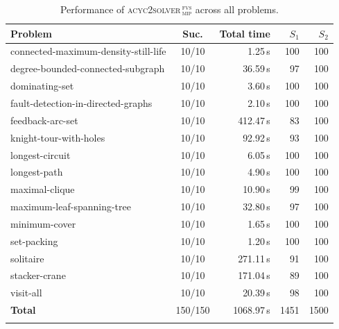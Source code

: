 \begin{table}[htbp]
\centering
\caption{Performance of \textsc{acyc2solver\,$_{\text{mip}}^{\text{fvs}}$} across all problems.}
\label{tab:performance-acyc2solver_mip_ve_smodels_gurobi}
\begin{tabular}{lcrrr}
\toprule
Problem & Suc. & Total time & $S_1$ & $S_2$ \\
\midrule
connected-maximum-density-still-life & 10/10 & 1.25\,s & 100 & 100 \\
degree-bounded-connected-subgraph & 10/10 & 36.59\,s & 97 & 100 \\
dominating-set & 10/10 & 3.60\,s & 100 & 100 \\
fault-detection-in-directed-graphs & 10/10 & 2.10\,s & 100 & 100 \\
feedback-arc-set & 10/10 & 412.47\,s & 83 & 100 \\
knight-tour-with-holes & 10/10 & 92.92\,s & 93 & 100 \\
longest-circuit & 10/10 & 6.05\,s & 100 & 100 \\
longest-path & 10/10 & 4.90\,s & 100 & 100 \\
maximal-clique & 10/10 & 10.90\,s & 99 & 100 \\
maximum-leaf-spanning-tree & 10/10 & 32.80\,s & 97 & 100 \\
minimum-cover & 10/10 & 1.65\,s & 100 & 100 \\
set-packing & 10/10 & 1.20\,s & 100 & 100 \\
solitaire & 10/10 & 271.11\,s & 91 & 100 \\
stacker-crane & 10/10 & 171.04\,s & 89 & 100 \\
visit-all & 10/10 & 20.39\,s & 98 & 100 \\
\midrule
\textbf{Total} & 150/150 & 1068.97\,s & 1451 & 1500 \\
\botrule
\end{tabular}
\end{table}

